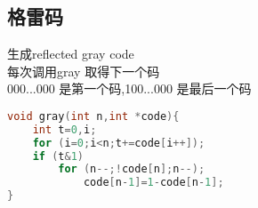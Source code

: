 \subsection{格雷码}
生成reflected gray code\\
每次调用gray 取得下一个码\\
000...000 是第一个码,100...000 是最后一个码\\
		\begin{lstlisting}[language=c++]
void gray(int n,int *code){
	int t=0,i;
	for (i=0;i<n;t+=code[i++]);
	if (t&1)
		for (n--;!code[n];n--);
			code[n-1]=1-code[n-1];
}
		\end{lstlisting}
